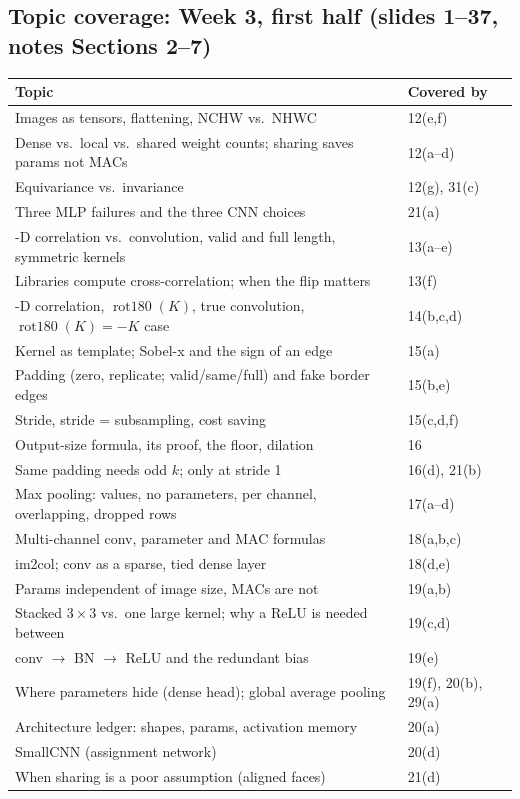 \documentclass[12pt,a4paper]{article}
\newcommand{\rot}{\operatorname{rot180}}
\begin{document}
\subsection*{Topic coverage: Week 3, first half (slides 1--37, notes Sections 2--7)}
\begin{center}
\begin{tabular}{@{}>{\raggedright\arraybackslash}p{}l@{}}
\toprule
Topic & Covered by\\
\midrule
Images as tensors, flattening, NCHW vs.\ NHWC & 12(e,f)\\
Dense vs.\ local vs.\ shared weight counts; sharing saves params not MACs & 12(a--d)\\
Equivariance vs.\ invariance & 12(g), 31(c)\\
Three MLP failures and the three CNN choices & 21(a)\\
1-D correlation vs.\ convolution, valid and full length, symmetric kernels & 13(a--e)\\
Libraries compute cross-correlation; when the flip matters & 13(f)\\
2-D correlation, $\rot(K)$, true convolution, $\rot(K)=-K$ case & 14(b,c,d)\\
Kernel as template; Sobel-x and the sign of an edge & 15(a)\\
Padding (zero, replicate; valid/same/full) and fake border edges & 15(b,e)\\
Stride, stride = subsampling, cost saving & 15(c,d,f)\\
Output-size formula, its proof, the floor, dilation & 16\\
Same padding needs odd $k$; only at stride 1 & 16(d), 21(b)\\
Max pooling: values, no parameters, per channel, overlapping, dropped rows & 17(a--d)\\
Multi-channel conv, parameter and MAC formulas & 18(a,b,c)\\
im2col; conv as a sparse, tied dense layer & 18(d,e)\\
Params independent of image size, MACs are not & 19(a,b)\\
Stacked $3\times3$ vs.\ one large kernel; why a ReLU is needed between & 19(c,d)\\
conv $\to$ BN $\to$ ReLU and the redundant bias & 19(e)\\
Where parameters hide (dense head); global average pooling & 19(f), 20(b), 29(a)\\
Architecture ledger: shapes, params, activation memory & 20(a)\\
SmallCNN (assignment network) & 20(d)\\
When sharing is a poor assumption (aligned faces) & 21(d)\\
\bottomrule
\end{tabular}
\end{center}
\end{document}
